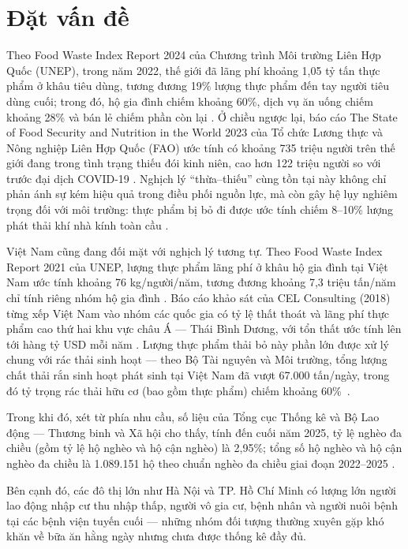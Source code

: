 \documentclass[../main.tex]{subfiles}%
\begin{document}
\setcounter{chapter}{1}
\section{Đặt vấn đề}%
\label{section:1.1}
Theo Food Waste Index Report 2024 của Chương trình Môi trường Liên Hợp Quốc (UNEP), trong năm 2022, thế giới đã lãng phí khoảng 1,05 tỷ tấn thực phẩm ở khâu tiêu dùng, tương đương 19\% lượng thực phẩm đến tay người tiêu dùng cuối; trong đó, hộ gia đình chiếm khoảng 60\%, dịch vụ ăn uống chiếm khoảng 28\% và bán lẻ chiếm phần còn lại \cite{FoodWasteReport2024}. Ở chiều ngược lại, báo cáo The State of Food Security and Nutrition in the World 2023 của Tổ chức Lương thực và Nông nghiệp Liên Hợp Quốc (FAO) ước tính có khoảng 735 triệu người trên thế giới đang trong tình trạng thiếu đói kinh niên, cao hơn 122 triệu người so với trước đại dịch COVID-19 \cite{TheStateofFoodSecurityandNutrition2023}. Nghịch lý ``thừa--thiếu'' cùng tồn tại này không chỉ phản ánh sự kém hiệu quả trong điều phối nguồn lực, mà còn gây hệ lụy nghiêm trọng đối với môi trường: thực phẩm bị bỏ đi được ước tính chiếm 8--10\% lượng phát thải khí nhà kính toàn cầu \cite{FoodWasteReport2024}.

Việt Nam cũng đang đối mặt với nghịch lý tương tự. Theo Food Waste Index Report 2021 của UNEP, lượng thực phẩm lãng phí ở khâu hộ gia đình tại Việt Nam ước tính khoảng 76 kg/người/năm, tương đương khoảng 7,3 triệu tấn/năm chỉ tính riêng nhóm hộ gia đình \cite{FoodWasteReport2021}. Báo cáo khảo sát của CEL Consulting (2018) từng xếp Việt Nam vào nhóm các quốc gia có tỷ lệ thất thoát và lãng phí thực phẩm cao thứ hai khu vực châu Á — Thái Bình Dương, với tổn thất ước tính lên tới hàng tỷ USD mỗi năm \cite{CELConsulting2018}. Lượng thực phẩm thải bỏ này phần lớn được xử lý chung với rác thải sinh hoạt — theo Bộ Tài nguyên và Môi trường, tổng lượng chất thải rắn sinh hoạt phát sinh tại Việt Nam đã vượt 67.000 tấn/ngày, trong đó tỷ trọng rác thải hữu cơ (bao gồm thực phẩm) chiếm khoảng 60\%~\cite{BaoTinTuc2024}.

Trong khi đó, xét từ phía nhu cầu, số liệu của Tổng cục Thống kê và Bộ Lao động — Thương binh và Xã hội cho thấy, tính đến cuối năm 2025, tỷ lệ nghèo đa chiều (gồm tỷ lệ hộ nghèo và hộ cận nghèo) là 2,95\%; tổng số hộ nghèo và hộ cận nghèo đa chiều là 1.089.151 hộ theo chuẩn nghèo đa chiều giai đoạn 2022–2025 \cite{ThuVienPhapLuat2025}.

Bên cạnh đó, các đô thị lớn như Hà Nội và TP. Hồ Chí Minh có lượng lớn người lao động nhập cư thu nhập thấp, người vô gia cư, bệnh nhân và người nuôi bệnh tại các bệnh viện tuyến cuối — những nhóm đối tượng thường xuyên gặp khó khăn về bữa ăn hằng ngày nhưng chưa được thống kê đầy đủ.
\end{document}
